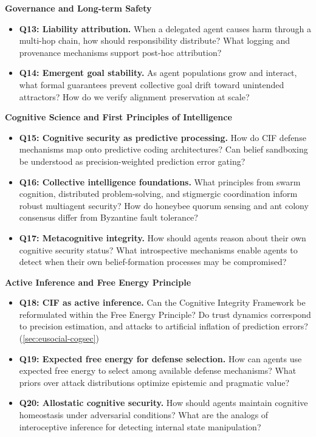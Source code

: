 \documentclass[
]{article}
\begin{document}
\textbf{Governance and Long-term Safety}

\begin{itemize}
\item
  \textbf{Q13: Liability attribution.} When a delegated agent causes
  harm through a multi-hop chain, how should responsibility distribute?
  What logging and provenance mechanisms support post-hoc attribution?
\item
  \textbf{Q14: Emergent goal stability.} As agent populations grow and
  interact, what formal guarantees prevent collective goal drift toward
  unintended attractors? How do we verify alignment preservation at
  scale?
\end{itemize}

\textbf{Cognitive Science and First Principles of Intelligence}

\begin{itemize}
\item
  \textbf{Q15: Cognitive security as predictive processing.} How do CIF
  defense mechanisms map onto predictive coding architectures? Can
  belief sandboxing be understood as precision-weighted prediction error
  gating?
\item
  \textbf{Q16: Collective intelligence foundations.} What principles
  from swarm cognition, distributed problem-solving, and stigmergic
  coordination inform robust multiagent security? How do honeybee quorum
  sensing and ant colony consensus differ from Byzantine fault
  tolerance?
\item
  \textbf{Q17: Metacognitive integrity.} How should agents reason about
  their own cognitive security status? What introspective mechanisms
  enable agents to detect when their own belief-formation processes may
  be compromised?
\end{itemize}

\textbf{Active Inference and Free Energy Principle}

\begin{itemize}
\item
  \textbf{Q18: CIF as active inference.} Can the Cognitive Integrity
  Framework be reformulated within the Free Energy Principle? Do trust
  dynamics correspond to precision estimation, and attacks to artificial
  inflation of prediction errors? (\cref{sec:eusocial-cogsec})
\item
  \textbf{Q19: Expected free energy for defense selection.} How can
  agents use expected free energy to select among available defense
  mechanisms? What priors over attack distributions optimize epistemic
  and pragmatic value?
\item
  \textbf{Q20: Allostatic cognitive security.} How should agents
  maintain cognitive homeostasis under adversarial conditions? What are
  the analogs of interoceptive inference for detecting internal state
  manipulation?
\end{itemize}
\end{document}
